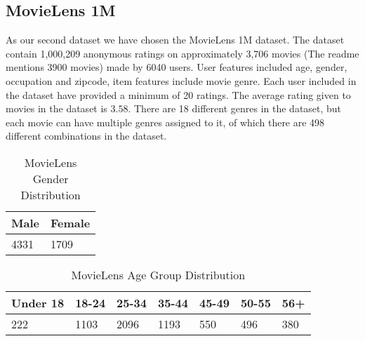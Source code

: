 \subsection{MovieLens 1M}

As our second dataset we have chosen the MovieLens 1M dataset. The dataset contain 1,000,209 anonymous ratings on approximately 3,706 movies (The readme mentions 3900 movies) made by 6040 users. User features included age, gender, occupation and zipcode, item features include movie genre. Each user included in the dataset have provided a minimum of 20 ratings. The average rating given to movies in the dataset is $3.58$. There are 18 different genres in the dataset, but each movie can have multiple genres assigned to it, of which there are 498 different combinations in the dataset.

\begin{table}
\centering
\begin{tabular}{|l|l|}
\hline
Male & Female \\ \hline
4331 & 1709 \\ \hline
\end{tabular}
\caption{MovieLens Gender Distribution}
\end{table}

\begin{table}
\centering
\begin{tabular}{|l|l|l|l|l|l|l|}
\hline
Under 18 & 18-24 & 25-34 	& 35-44 	& 45-49 & 50-55 & 56+ \\ \hline
222		 &	1103 &	2096	&	1193	& 550	& 496	& 380 \\ \hline
\end{tabular}
\caption{MovieLens Age Group Distribution}
\end{table}

